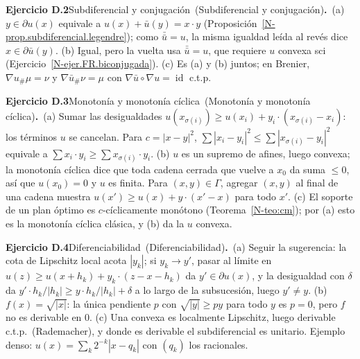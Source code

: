 \documentclass[11pt,a4paper]{amsart}
\newcommand{\id}{\operatorname{id}}
\theoremstyle{remark}
\theoremstyle{definition}
\numberwithin{subsection}{section}
\numberwithin{equation}{section}
\newcommand{\ejlabel}[2]{\par\medskip\noindent\textbf{Ejercicio #1}\ifx\relax#2\relax\else\ (#2)\fi\textbf{.}\ }
\begin{document}
\ejlabel{D.2}{Subdiferencial y conjugación}(a) $y\in\partial u(x)$ equivale a $u(x)+\bar u(y)=x\cdot y$ (Proposición~\ref{N-prop.subdiferencial.legendre}); como $\bar{\bar u}=u$, la misma igualdad leída al revés dice $x\in\partial\bar u(y)$. (b) Igual, pero la vuelta usa $\bar{\bar u}=u$, que requiere $u$ convexa sci (Ejercicio~\ref{N-ejer.FR.biconjugada}). (c) Es (a) y (b) juntos; en Brenier, $\nabla u_\#\mu=\nu$ y $\nabla\bar u_\#\nu=\mu$ con $\nabla\bar u\circ\nabla u=\id$ c.t.p.

\ejlabel{D.3}{Monotonía y monotonía cíclica}(a) Sumar las desigualdades $u(x_{\sigma(i)})\ge u(x_i)+y_i\cdot(x_{\sigma(i)}-x_i)$: los términos $u$ se cancelan. Para $c=|x-y|^2$, $\sum|x_i-y_i|^2\le\sum|x_{\sigma(i)}-y_i|^2$ equivale a $\sum x_i\cdot y_i\ge\sum x_{\sigma(i)}\cdot y_i$. (b) $u$ es un supremo de afines, luego convexa; la monotonía cíclica dice que toda cadena cerrada que vuelve a $x_0$ da suma $\le0$, así que $u(x_0)=0$ y $u$ es finita. Para $(x,y)\in\Gamma$, agregar $(x,y)$ al final de una cadena muestra $u(x')\ge u(x)+y\cdot(x'-x)$ para todo $x'$. (c) El soporte de un plan óptimo es $c$-cíclicamente monótono (Teorema~\ref{N-teo:cm}); por (a) esto es la monotonía cíclica clásica, y (b) da la $u$ convexa.

\ejlabel{D.4}{Diferenciabilidad}(a) Seguir la sugerencia: la cota de Lipschitz local acota $|y_k|$; si $y_k\to y'$, pasar al límite en $u(z)\ge u(x+h_k)+y_k\cdot(z-x-h_k)$ da $y'\in\partial u(x)$, y la desigualdad con $\delta$ da $y'\cdot h_k/|h_k|\ge y\cdot h_k/|h_k|+\delta$ a lo largo de la subsucesión, luego $y'\ne y$. (b) $f(x)=\sqrt{|x|}$: la única pendiente $p$ con $\sqrt{|y|}\ge py$ para todo $y$ es $p=0$, pero $f$ no es derivable en $0$. (c) Una convexa es localmente Lipschitz, luego derivable c.t.p.\ (Rademacher), y donde es derivable el subdiferencial es unitario. Ejemplo denso: $u(x)=\sum_k2^{-k}|x-q_k|$ con $(q_k)$ los racionales.
\end{document}
